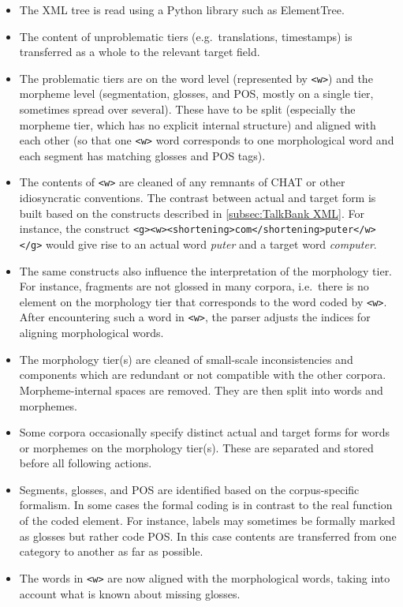 \documentclass[a4paper, 11pt]{book}
\begin{document}
\begin{itemize}
	\item The XML tree is read using a Python library such as ElementTree. 
	\item The content of unproblematic tiers (e.g.\ translations, timestamps) is transferred as a whole to the relevant target field. 
	\item The problematic tiers are on the word level (represented by \texttt{<w>}) and the morpheme level (segmentation, glosses, and POS, mostly on a single tier, sometimes spread over several). 
		These have to be split (especially the morpheme tier, which has no explicit internal structure) and aligned with each other (so that one \texttt{<w>} word corresponds to one morphological word
		and each segment has matching glosses and POS tags). 
	\item The contents of \texttt{<w>} are cleaned of any remnants of CHAT or other idiosyncratic conventions. The contrast between actual and target form is built based on the constructs described 
		in \autoref{subsec:TalkBank XML}. For instance, the construct \texttt{<g><w><shortening>com</shortening>puter</w> </g>} would give rise to an actual word \emph{puter} and a target word \emph{computer}. 
	\item The same constructs also influence the interpretation of the morphology tier. For instance, fragments are not glossed in many corpora, i.e.\ there is no element on the 
		morphology tier that corresponds to the word coded by \texttt{<w>}. After encountering such a word in \texttt{<w>}, the parser adjusts the indices for aligning morphological words. 
	\item The morphology tier(s) are cleaned of small-scale inconsistencies and components which are redundant or not compatible with the other corpora. Morpheme-internal spaces are removed. 
		They are then split into words and morphemes. 
	\item Some corpora occasionally specify distinct actual and target forms for words or morphemes on the morphology tier(s). These are separated and stored before all following actions. 
	\item Segments, glosses, and POS are identified based on the corpus-specific formalism. In some cases the formal coding is in contrast to the real function of the coded element. For instance, 
		labels may sometimes be formally marked as glosses but rather code POS. In this case contents are transferred from one category to another as far as possible. 
	\item The words in \texttt{<w>} are now aligned with the morphological words, taking into account what is known about missing glosses. 
\end{itemize}
\end{document}
